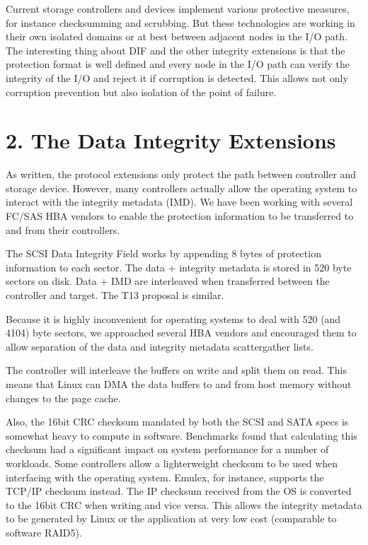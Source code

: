 \documentclass[a4paper,11pt,english]{sphinxmanual}
\begin{document}
Current storage controllers and devices implement various protective
measures, for instance checksumming and scrubbing.  But these
technologies are working in their own isolated domains or at best
between adjacent nodes in the I/O path.  The interesting thing about
DIF and the other integrity extensions is that the protection format
is well defined and every node in the I/O path can verify the
integrity of the I/O and reject it if corruption is detected.  This
allows not only corruption prevention but also isolation of the point
of failure.


\section{2. The Data Integrity Extensions}
\label{\detokenize{data-integrity:the-data-integrity-extensions}}
As written, the protocol extensions only protect the path between
controller and storage device.  However, many controllers actually
allow the operating system to interact with the integrity metadata
(IMD).  We have been working with several FC/SAS HBA vendors to enable
the protection information to be transferred to and from their
controllers.

The SCSI Data Integrity Field works by appending 8 bytes of protection
information to each sector.  The data + integrity metadata is stored
in 520 byte sectors on disk.  Data + IMD are interleaved when
transferred between the controller and target.  The T13 proposal is
similar.

Because it is highly inconvenient for operating systems to deal with
520 (and 4104) byte sectors, we approached several HBA vendors and
encouraged them to allow separation of the data and integrity metadata
scatter\sphinxhyphen{}gather lists.

The controller will interleave the buffers on write and split them on
read.  This means that Linux can DMA the data buffers to and from
host memory without changes to the page cache.

Also, the 16\sphinxhyphen{}bit CRC checksum mandated by both the SCSI and SATA specs
is somewhat heavy to compute in software.  Benchmarks found that
calculating this checksum had a significant impact on system
performance for a number of workloads.  Some controllers allow a
lighter\sphinxhyphen{}weight checksum to be used when interfacing with the operating
system.  Emulex, for instance, supports the TCP/IP checksum instead.
The IP checksum received from the OS is converted to the 16\sphinxhyphen{}bit CRC
when writing and vice versa.  This allows the integrity metadata to be
generated by Linux or the application at very low cost (comparable to
software RAID5).
\end{document}
